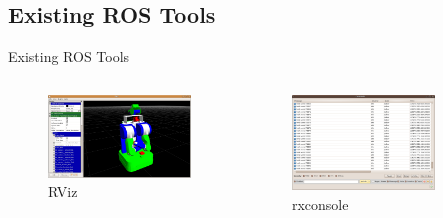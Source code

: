 \documentclass[compress]{beamer}
\begin{document}
\subsection{Existing ROS Tools}
\begin{frame}{Existing ROS Tools}

\begin{columns}
\begin{column}{.4\textwidth}
\begin{figure}[t]
    \centering
    \includegraphics[width=.9\textwidth]{images/RVizRobotModel.png}
    \caption{RViz}
\end{figure}
\end{column}%
\hfill%
\begin{column}{.4\textwidth}
\begin{figure}[t]
    \centering
    \includegraphics[width=.9\textwidth]{images/rxconsole.png}
    \caption{rxconsole}
\end{figure}
\end{column}%
\hfill%
\begin{column}{.4\textwidth}
\begin{figure}[t]

\end{figure}
\end{column}
\end{columns}
\end{frame}
\end{document}
